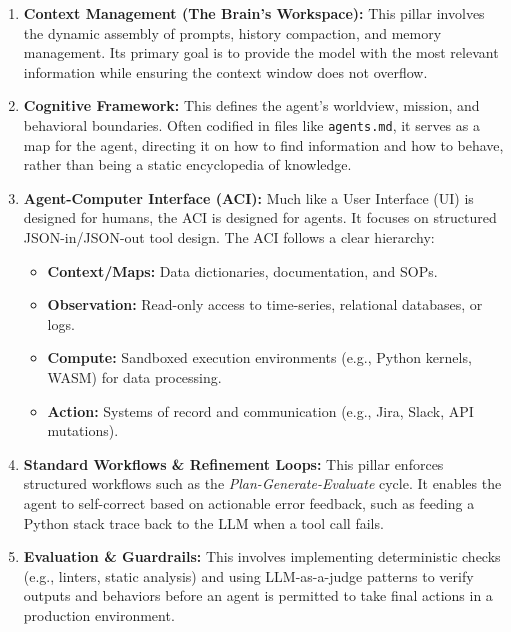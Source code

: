 \begin{enumerate}
    \item \textbf{Context Management (The Brain's Workspace):} This pillar involves the dynamic assembly of prompts, history compaction, and memory management. Its primary goal is to provide the model with the most relevant information while ensuring the context window does not overflow.
    
    \item \textbf{Cognitive Framework:} This defines the agent's worldview, mission, and behavioral boundaries. Often codified in files like \texttt{agents.md}, it serves as a map for the agent, directing it on how to find information and how to behave, rather than being a static encyclopedia of knowledge.
    
    \item \textbf{Agent-Computer Interface (ACI):} Much like a User Interface (UI) is designed for humans, the ACI is designed for agents. It focuses on structured JSON-in/JSON-out tool design. The ACI follows a clear hierarchy:
    \begin{itemize}
        \item \textbf{Context/Maps:} Data dictionaries, documentation, and SOPs.
        \item \textbf{Observation:} Read-only access to time-series, relational databases, or logs.
        \item \textbf{Compute:} Sandboxed execution environments (e.g., Python kernels, WASM) for data processing.
        \item \textbf{Action:} Systems of record and communication (e.g., Jira, Slack, API mutations).
    \end{itemize}
    
    \item \textbf{Standard Workflows \& Refinement Loops:} This pillar enforces structured workflows such as the \textit{Plan-Generate-Evaluate} cycle. It enables the agent to self-correct based on actionable error feedback, such as feeding a Python stack trace back to the LLM when a tool call fails.
    
    \item \textbf{Evaluation \& Guardrails:} This involves implementing deterministic checks (e.g., linters, static analysis) and using LLM-as-a-judge patterns to verify outputs and behaviors before an agent is permitted to take final actions in a production environment.
\end{enumerate}
